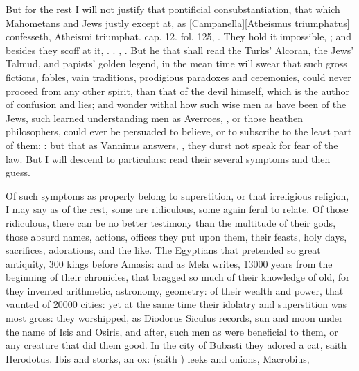 {But for the rest I will not justify that pontificial consubstantiation,
that which Mahometans and Jews justly except at, as [Campanella][\textlatin{Atheismus triumphatus}]
confesseth, \textlatin{Atheismi triumphat. cap. 12. fol. 125}, . They hold it impossible, ; and besides they scoff at it, . . , \etc{}. But
he that shall read the Turks' Alcoran, the Jews' Talmud, and
papists' golden legend, in the mean time will swear that such gross
fictions, fables, vain traditions, prodigious paradoxes and ceremonies,
could never proceed from any other spirit, than that of the devil
himself, which is the author of confusion and lies; and wonder withal
how such wise men as have been of the Jews, such learned understanding
men as Averroes, \Avicenna{}, or those heathen philosophers, could ever be
persuaded to believe, or to subscribe to the least part of them: : but that as Vanninus answers, , they durst not
speak for fear of the law. But I will descend to particulars: read
their several symptoms and then guess.

Of such symptoms as properly belong to superstition, or that
irreligious religion, I may say as of the rest, some are ridiculous,
some again feral to relate. Of those ridiculous, there can be no better
testimony than the multitude of their gods, those absurd names,
actions, offices they put upon them, their feasts, holy days,
sacrifices, adorations, and the like. The Egyptians that pretended so
great antiquity, 300 kings before Amasis: and as Mela writes, 13\thinspace{}000
years from the beginning of their chronicles, that bragged so much of
their knowledge of old, for they invented arithmetic, astronomy,
geometry: of their wealth and power, that vaunted of 20\thinspace{}000 cities: yet
at the same time their idolatry and superstition was most gross: they
worshipped, as Diodorus Siculus records, sun and moon under the name of
Isis and Osiris, and after, such men as were beneficial to them, or any
creature that did them good. In the city of Bubasti they adored a cat,
saith Herodotus. Ibis and storks, an ox: (saith \Pliny{}) leeks and
onions, Macrobius,

}
